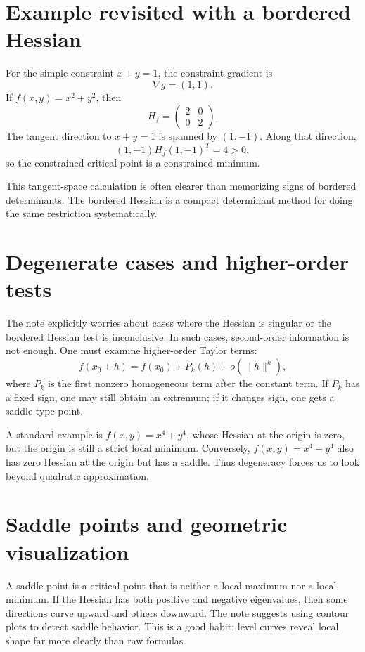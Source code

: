 \section{Example revisited with a bordered Hessian}

For the simple constraint $x+y=1$, the constraint gradient is
\[
  \nabla g=(1,1).
\]
If $f(x,y)=x^2+y^2$, then
\[
  H_f=
  \begin{pmatrix}
  2&0\\
  0&2
  \end{pmatrix}.
\]
The tangent direction to $x+y=1$ is spanned by $(1,-1)$.  Along that direction,
\[
  (1,-1)H_f(1,-1)^T=4>0,
\]
so the constrained critical point is a constrained minimum.

This tangent-space calculation is often clearer than memorizing signs of bordered determinants.  The bordered Hessian is a compact determinant method for doing the same restriction systematically.

\section{Degenerate cases and higher-order tests}

The note explicitly worries about cases where the Hessian is singular or the bordered Hessian test is inconclusive.  In such cases, second-order information is not enough.  One must examine higher-order Taylor terms:
\[
  f(x_0+h)=f(x_0)+P_k(h)+o(\|h\|^k),
\]
where $P_k$ is the first nonzero homogeneous term after the constant term.  If $P_k$ has a fixed sign, one may still obtain an extremum; if it changes sign, one gets a saddle-type point.

A standard example is $f(x,y)=x^4+y^4$, whose Hessian at the origin is zero, but the origin is still a strict local minimum.  Conversely, $f(x,y)=x^4-y^4$ also has zero Hessian at the origin but has a saddle.  Thus degeneracy forces us to look beyond quadratic approximation.

\section{Saddle points and geometric visualization}

A saddle point is a critical point that is neither a local maximum nor a local minimum.  If the Hessian has both positive and negative eigenvalues, then some directions curve upward and others downward.  The note suggests using contour plots to detect saddle behavior.  This is a good habit: level curves reveal local shape far more clearly than raw formulas.

